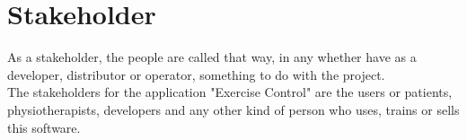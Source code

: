 \section{Stakeholder}
As a stakeholder, the people are called that way, in any whether have as a developer, distributor or operator, something to do with the project.
\\[10pt]
The stakeholders for the application "Exercise Control" are the users or patients, physiotherapists, developers and any other kind of person who uses, trains or sells this software.
